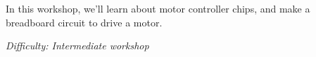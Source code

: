 %
%
%



\newcommand{\workshopTitle}{Workshop 11: GPIO \& Motors}

\newcommand{\workshopAuthor}{Jack Kelly}



	
	
	In this workshop, we'll learn about motor controller chips, and make a breadboard circuit to drive a motor. 
	
	\textit{Difficulty: Intermediate workshop}
	
	\setcounter{tocdepth}{1}
	\tableofcontents
	\vspace{12pt}
	
	
	
	
	
	
	\begin{appendices}	
		\iftoggle{isPRINT}{}{}
		\newpage
		
		
	\end{appendices}

